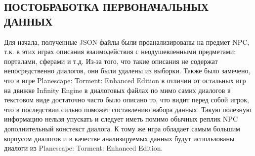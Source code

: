 \subsection{ПОСТОБРАБОТКА ПЕРВОНАЧАЛЬНЫХ ДАННЫХ}

Для начала, полученные JSON файлы были проанализированы на предмет NPC, т.к. в этих играх описания взаимодействия с неодушевленными предметами: порталами, сферами и т.д. Из-за того, что такие описания не содержат непосредственно диалогов, они были удалены из выборки. Также было замечено, что в игре Planescape: Torment: Enhanced Edition в отличии от остальных игр на движке Infinity Engine в диалоговых файлах по мимо самих диалогов в текстовом виде достаточно часто было описано то, что видит перед собой игрок, что в последствии сильно поможет составлению набора данных. Такую полезную информацию нельзя упускать и следует иметь помимо обычных реплик NPC дополнительный констекст диалога. К тому же игра обладает самым большим корпусом диалогов и в качестве анализируемых данных будут использованы диалоги из Planescape: Torment: Enhanced Edition.